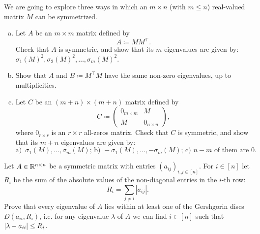 \begin{myexercise}\label{prob:symmetrization}
    We are going to explore three ways in which an $m \times n$ (with $m \leq n$) real-valued matrix $M$ can be symmetrized.
    \begin{enumerate}[(a)]
        \item Let $A$ be an $m \times m$ matrix defined by
        \begin{equation*}
            A \coloneqq M M^\top.
        \end{equation*}
        Check that $A$ is symmetric, and show that its $m$ eigenvalues are given by: $\sigma_1(M)^2, \sigma_2(M)^2, \ldots, \sigma_m(M)^2$.

        \item Show that $A$ and $B \coloneqq M^\top M$ have the same non-zero eigenvalues, up to multiplicities.
        
        \item Let $C$ be an $(m+n) \times (m+n)$ matrix defined by
        \begin{equation*}
            C \coloneqq \begin{pmatrix} 0_{m \times m} & M \\ M^\top & 0_{n \times n} \end{pmatrix},
        \end{equation*}
        where $0_{r \times r}$ is an $r \times r$ all-zeros matrix. Check that $C$ is symmetric, and show that its $m+n$ eigenvalues are given by:
        $$\text{a) }\, \sigma_1(M), \ldots, \sigma_m(M); \, \text{b) }
        -\sigma_1(M), \ldots, -\sigma_m(M); \, 
        \text{c) $n-m$ of them are 0}.$$    
    \end{enumerate}
\end{myexercise}

\begin{myexercise}\label{prob:gershgorin}
    Let $A \in \mathbb{R}^{n \times n}$ be a symmetric matrix with entries $(a_{ij})_{i,j\in[n]}$. For $i\in [n]$ let $R_{i}$ be the sum of the absolute values of the non-diagonal entries in the $i$-th row:
    \begin{equation*}
        R_{i}=\sum _{j\neq {i}}\left|a_{ij}\right|.
    \end{equation*}
    Prove that every eigenvalue of $A$ lies within at least one of the Gershgorin discs $D(a_{ii},R_{i})$, i.e. for any eigenvalue $\lambda$ of $A$ we can find $i \in [n]$ such that $|\lambda - a_{ii}| \leq R_i$.
\end{myexercise}



